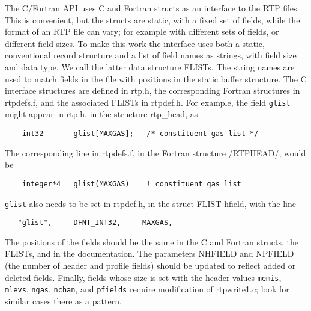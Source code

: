 \documentclass[11pt]{article}
\begin{document}
The C/Fortran API uses C and Fortran structs as an interface to the
RTP files.  This is convenient, but the structs are static, with a
fixed set of fields, while the format of an RTP file can vary; for
example with different sets of fields, or different field sizes.  To
make this work the interface uses both a static, conventional record
structure and a list of field names as strings, with field size and
data type.  We call the latter data structure FLISTs.  The string
names are used to match fields in the file with positions in the
static buffer structure.  The C interface structures are defined in
rtp.h, the corresponding Fortran structures in rtpdefs.f, and the
associated FLISTs in rtpdef.h.  For example, the field {\tt glist}
might appear in rtp.h, in the structure rtp\_head, as
\begin{verbatim}
    int32       glist[MAXGAS];   /* constituent gas list */
\end{verbatim}
\noindent 
The corresponding line in rtpdefs.f, in the Fortran structure
/RTPHEAD/, would be
\begin{verbatim}
    integer*4   glist(MAXGAS)    ! constituent gas list
\end{verbatim}
\noindent
{\tt glist} also needs to be set in rtpdef.h, in the struct FLIST
hfield, with the line
\begin{verbatim}
   "glist",     DFNT_INT32,     MAXGAS,
\end{verbatim}
\noindent
The positions of the fields should be the same in the C and Fortran
structs, the FLISTs, and in the documentation.  The parameters
NHFIELD and NPFIELD (the number of header and profile fields) should
be updated to reflect added or deleted fields.  Finally, fields
whose size is set with the header values {\tt memis}, {\tt mlevs},
{\tt ngas}, {\tt nchan}, and {\tt pfields} require modification of
rtpwrite1.c; look for similar cases there as a pattern.

\newpage
\end{document}
